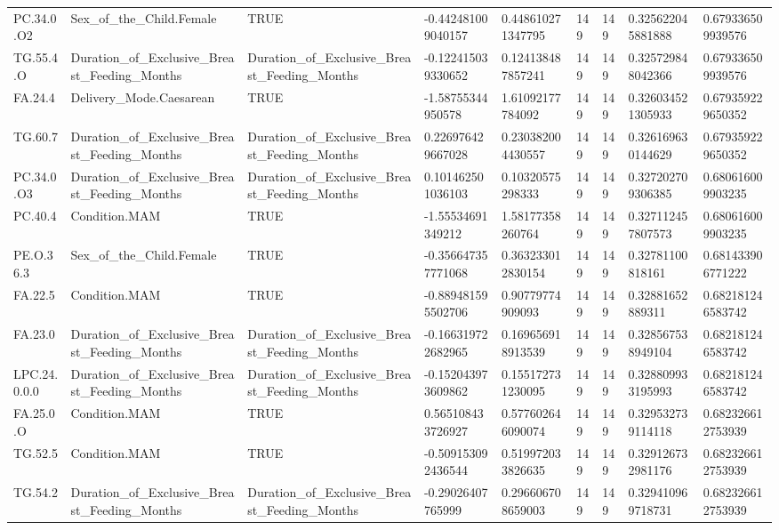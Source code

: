 \begin{longtable}{lllllllll}
PC.34.0.O2 & Sex\_of\_the\_Child.Female & TRUE & -0.442481009040157 & 0.448610271347795 & 149 & 149 & 0.325622045881888 & 0.679336509939576 \\
TG.55.4.O & Duration\_of\_Exclusive\_Breast\_Feeding\_Months & Duration\_of\_Exclusive\_Breast\_Feeding\_Months & -0.122415039330652 & 0.124138487857241 & 149 & 149 & 0.325729848042366 & 0.679336509939576 \\
FA.24.4 & Delivery\_Mode.Caesarean & TRUE & -1.58755344950578 & 1.61092177784092 & 149 & 149 & 0.326034521305933 & 0.679359229650352 \\
TG.60.7 & Duration\_of\_Exclusive\_Breast\_Feeding\_Months & Duration\_of\_Exclusive\_Breast\_Feeding\_Months & 0.226976429667028 & 0.230382004430557 & 149 & 149 & 0.326169630144629 & 0.679359229650352 \\
PC.34.0.O3 & Duration\_of\_Exclusive\_Breast\_Feeding\_Months & Duration\_of\_Exclusive\_Breast\_Feeding\_Months & 0.101462501036103 & 0.10320575298333 & 149 & 149 & 0.327202709306385 & 0.680616009903235 \\
PC.40.4 & Condition.MAM & TRUE & -1.55534691349212 & 1.58177358260764 & 149 & 149 & 0.327112457807573 & 0.680616009903235 \\
PE.O.36.3 & Sex\_of\_the\_Child.Female & TRUE & -0.356647357771068 & 0.363233012830154 & 149 & 149 & 0.32781100818161 & 0.681433906771222 \\
FA.22.5 & Condition.MAM & TRUE & -0.889481595502706 & 0.90779774909093 & 149 & 149 & 0.32881652889311 & 0.682181246583742 \\
FA.23.0 & Duration\_of\_Exclusive\_Breast\_Feeding\_Months & Duration\_of\_Exclusive\_Breast\_Feeding\_Months & -0.166319722682965 & 0.169656918913539 & 149 & 149 & 0.328567538949104 & 0.682181246583742 \\
LPC.24.0.0.0 & Duration\_of\_Exclusive\_Breast\_Feeding\_Months & Duration\_of\_Exclusive\_Breast\_Feeding\_Months & -0.152043973609862 & 0.155172731230095 & 149 & 149 & 0.328809933195993 & 0.682181246583742 \\
FA.25.0.O & Condition.MAM & TRUE & 0.565108433726927 & 0.577602646090074 & 149 & 149 & 0.329532739114118 & 0.682326612753939 \\
TG.52.5 & Condition.MAM & TRUE & -0.509153092436544 & 0.519972033826635 & 149 & 149 & 0.329126732981176 & 0.682326612753939 \\
TG.54.2 & Duration\_of\_Exclusive\_Breast\_Feeding\_Months & Duration\_of\_Exclusive\_Breast\_Feeding\_Months & -0.29026407765999 & 0.296606708659003 & 149 & 149 & 0.329410969718731 & 0.682326612753939 \\

\end{longtable}

